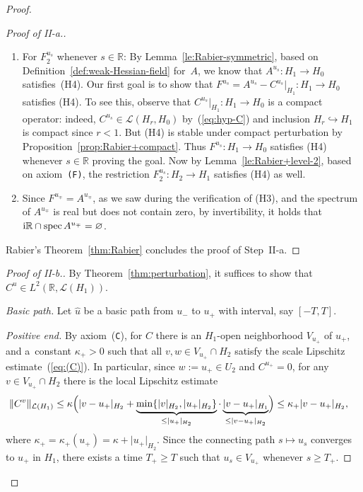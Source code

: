 \documentclass[pdftex]{sigma}
\numberwithin{equation}{section}
\newcommand{\R}{{\mathbb{R}}}
\newcommand{\Ll}{{\mathcal{L}}} %
\newcommand{\spec}{\mathrm{spec}\,} %
\newcommand{\norm}{{\rm norm}}
\def\abs#1{\mathopen|#1\mathclose|}
\def\norm#1{\mathopen\|#1\mathclose\|}
\newcommand{\INTO}{\hookrightarrow} %
\newcommand{\1}{{{\mathchoice {\rm 1\mskip-4mu l} {\rm 1\mskip-4mu l}
{\rm 1\mskip-4.5mu l} {\rm 1\mskip-5mu l}}}}
\begin{document}
\begin{proof}
\begin{proof}[Proof of II-a.]
\begin{enumerate}
\item[(H4)] For $F^{u_s}_2$ whenever $s\in\R$:
By Lemma~\ref{le:Rabier-symmetric}, based on
Definition~\ref{def:weak-Hessian-field} for~$A$,
we know that $A^{u_s}\colon H_1\to H_0$ satisfies~(H4).
Our first goal is to show that
$F^{u_s} =A^{u_s}-C^{u_s}|_{H_1}\colon H_1\to H_0$ satisfies (H4).
To see this, observe that $C^{u_s}|_{H_1}\colon H_1\to H_0$ is a compact
operator: indeed, $C^{u_s}\in\Ll(H_r,H_0)$ by~(\ref{eq:hyp-C})
and inclusion $H_r\INTO H_1$ is compact since $r<1$.
But (H4) is stable under compact perturbation
by Proposition~\ref{prop:Rabier+compact}.
Thus $F^{u_s}\colon H_1\to H_0$ satisfies (H4)
whenever $s\in\R$ proving the goal.
Now by Lemma~\ref{le:Rabier+level-2},
based on axiom~\texttt{(F)},
the restriction $F^{u_s}_2\colon H_2\to H_1$
satisfies (H4) as well.

\item[(H5)]
Since $F^{u_\mp}=A^{u_\mp}$, as we saw during the verification of
(H3), and the spectrum of $A^{u_\mp}$ is real but does not contain
zero, by invertibility, it holds that
${\rm i}\R\cap\spec A^{u_\mp}=\varnothing$.
\end{enumerate}

Rabier's Theorem~\ref{thm:Rabier} concludes the proof of Step~II-a.
\end{proof}

\begin{proof}[Proof of II-b.]
By Theorem~\ref{thm:perturbation},
it suffices to show that $C^u\in L^2(\R,\Ll(H_1))$.

\textit{Basic path.}
Let $\hat u$ be a basic path from $u_-$ to $u_+$
with interval, say $[-T, T]$.

\textit{Positive end.}
By axiom~(\texttt{C}), for $C$
there is an $H_1$-open neighborhood $V_{u_+}$ of $u_+$,
and a~constant $\kappa_+>0$ such that all $v,w\in V_{u_+}\cap H_2$
satisfy the scale Lipschitz estimate~(\ref{eq:(C)}).
In particular, since $w:=u_+\in U_2$ and $C^{u_+}=0$,
for any $v\in V_{u_+}\cap H_2$ there is the local Lipschitz estimate
\begin{align}
 \norm{C^v}_{\Ll(H_1)}
 &\le\kappa\Bigl(\abs{v-u_+}_{H_2}
 +\underbrace{\min\{\abs{v}_{H_2},\abs{u_+}_{H_2}\}}_{\le\abs{u_+}_{H_2}}
 \cdot \underbrace{\abs{v-u_+}_{H_1}}_{\le \abs{v-u_+}_{H_2}}\Bigr)
 \le\kappa_+ \abs{v-u_+}_{H_2},\label{eq:pos-end}
\end{align}
where $\kappa_+=\kappa_+(u_+)=\kappa+\abs{u_+}_{H_2}$.
Since the connecting path $s\mapsto u_s$ converges to $u_+$
in $H_1$, there exists a time $T_+\ge T$ such that
$u_s\in V_{u_+}$ whenever $s\ge T_+$.


\end{proof}
\end{proof}
\end{document}
